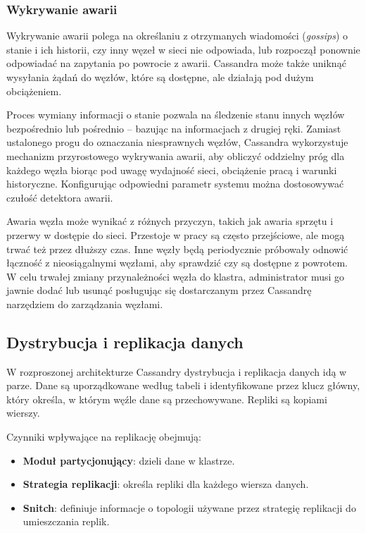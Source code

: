 \subsubsection{Wykrywanie awarii}

Wykrywanie awarii polega na określaniu z otrzymanych wiadomości (\textit{gossips}) o stanie i ich historii, czy inny węzeł w sieci nie odpowiada, lub rozpoczął ponownie odpowiadać na zapytania po powrocie z awarii.
Cassandra może także uniknąć wysyłania żądań do węzłów, które są dostępne, ale działają pod dużym obciążeniem.

Proces wymiany informacji o stanie pozwala na śledzenie stanu innych węzłów bezpośrednio lub pośrednio -- bazując na informacjach z drugiej ręki.
Zamiast ustalonego progu do oznaczania niesprawnych węzłów, Cassandra wykorzystuje mechanizm przyrostowego wykrywania awarii, aby obliczyć oddzielny próg dla każdego węzła biorąc pod uwagę wydajność sieci, obciążenie pracą i warunki historyczne.
Konfigurując odpowiedni parametr systemu można dostosowywać czułość detektora awarii.

Awaria węzła może wynikać z różnych przyczyn, takich jak awaria sprzętu i przerwy w dostępie do sieci.
Przestoje w pracy są często przejściowe, ale mogą trwać też przez dłuższy czas.
Inne węzły będą periodycznie próbowały odnowić łączność z nieosiągalnymi węzłami, aby sprawdzić czy są dostępne z powrotem.
W celu trwałej zmiany przynależności węzła do klastra, administrator musi go jawnie dodać lub usunąć posługując się dostarczanym przez Cassandrę narzędziem do zarządzania węzłami.

\subsection{Dystrybucja i replikacja danych}

W rozproszonej architekturze Cassandry dystrybucja i replikacja danych idą w parze.
Dane są uporządkowane według tabeli i identyfikowane przez klucz główny, który określa, w którym węźle dane są przechowywane.
Repliki są kopiami wierszy.

Czynniki wpływające na replikację obejmują: 
\begin{itemize}
    \item \textbf{Moduł partycjonujący}: dzieli dane w klastrze.
    \item \textbf{Strategia replikacji}: określa repliki dla każdego wiersza danych.
    \item \textbf{Snitch}: definiuje informacje o topologii używane przez strategię replikacji do umieszczania replik.
\end{itemize}

